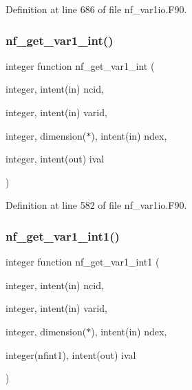 Definition at line 686 of file nf\+\_\+var1io.\+F90.

\mbox{\label{nf__var1io_8F90_a92c438f1cc42f38d3c66f6342d884b8d}} 
\subsubsection{\texorpdfstring{nf\+\_\+get\+\_\+var1\+\_\+int()}{nf\_get\_var1\_int()}}
{\footnotesize\ttfamily integer function nf\+\_\+get\+\_\+var1\+\_\+int (\begin{DoxyParamCaption}\item[{integer, intent(in)}]{ncid,  }\item[{integer, intent(in)}]{varid,  }\item[{integer, dimension($\ast$), intent(in)}]{ndex,  }\item[{integer, intent(out)}]{ival }\end{DoxyParamCaption})}



Definition at line 582 of file nf\+\_\+var1io.\+F90.

\mbox{\label{nf__var1io_8F90_a0fc2a64f64269d7a6ab53bc9ced96dfd}} 
\subsubsection{\texorpdfstring{nf\+\_\+get\+\_\+var1\+\_\+int1()}{nf\_get\_var1\_int1()}}
{\footnotesize\ttfamily integer function nf\+\_\+get\+\_\+var1\+\_\+int1 (\begin{DoxyParamCaption}\item[{integer, intent(in)}]{ncid,  }\item[{integer, intent(in)}]{varid,  }\item[{integer, dimension($\ast$), intent(in)}]{ndex,  }\item[{integer(nfint1), intent(out)}]{ival }\end{DoxyParamCaption})}



